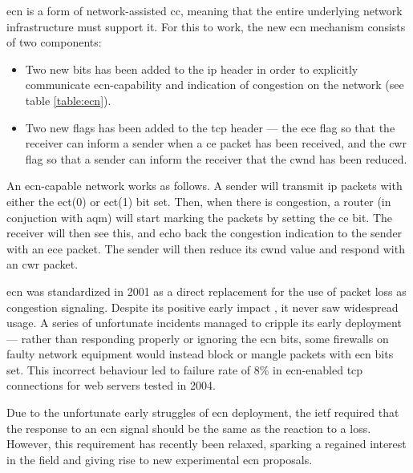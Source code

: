 \gls{ecn} is a form of network-assisted \gls{cc}, meaning that the entire underlying network infrastructure must support it. For this to work, the new \gls{ecn} mechanism consists of two components:

\begin{itemize}
    \item Two new bits has been added to the \gls{ip} header in order to explicitly communicate \gls{ecn}-capability and indication of congestion on the network (see table \ref{table:ecn}).
    \item Two new flags has been added to the \gls{tcp} header --- the \gls{ece} flag so that the receiver can inform a sender when a \gls{ce} packet has been received, and the \gls{cwr} flag so that a sender can inform the receiver that the \gls{cwnd} has been reduced.
\end{itemize}

An \gls{ecn}-capable network works as follows. A sender will transmit \gls{ip} packets with either the \gls{ect}(0) or \gls{ect}(1) bit set. Then, when there is congestion, a router (in conjuction with \gls{aqm}) will start marking the packets by setting the \gls{ce} bit. The receiver will then see this, and echo back the congestion indication to the sender with an \gls{ece} packet. The sender will then reduce its \gls{cwnd} value and respond with an \gls{cwr} packet.


\gls{ecn} was standardized in 2001 as a direct replacement for the use of packet loss as congestion signaling. \cite{rfc3168} Despite its positive early impact \cite{rfc2884}, it never saw widespread usage. \cite{enabling_internet-wide_ecn} A series of unfortunate incidents managed to cripple its early deployment --- rather than responding properly or ignoring the \gls{ecn} bits, some firewalls on faulty network equipment would instead block or mangle packets with \gls{ecn} bits set. This incorrect behaviour led to failure rate of 8\% in \gls{ecn}-enabled \gls{tcp} connections for web servers tested in 2004. \cite{pre-congestion_notification}

Due to the unfortunate early struggles of \gls{ecn} deployment, the \gls{ietf} required that the response to an \gls{ecn} signal should be the same as the reaction to a loss. \cite{rfc3168} However, this requirement has recently been relaxed, \cite{rfc8311} sparking  a regained interest in the field and giving rise to new experimental \gls{ecn} proposals. 

